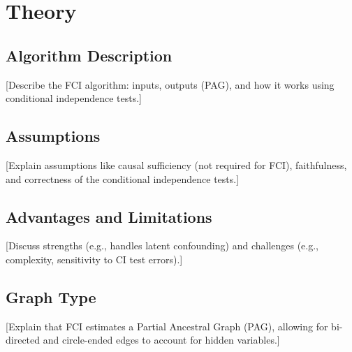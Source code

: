 \section{Theory}

\subsection{Algorithm Description}
[Describe the FCI algorithm: inputs, outputs (PAG), and how it works using conditional independence tests.]

\subsection{Assumptions}
[Explain assumptions like causal sufficiency (not required for FCI), faithfulness, and correctness of the conditional independence tests.]

\subsection{Advantages and Limitations}
[Discuss strengths (e.g., handles latent confounding) and challenges (e.g., complexity, sensitivity to CI test errors).]

\subsection{Graph Type}
[Explain that FCI estimates a Partial Ancestral Graph (PAG), allowing for bi-directed and circle-ended edges to account for hidden variables.]
